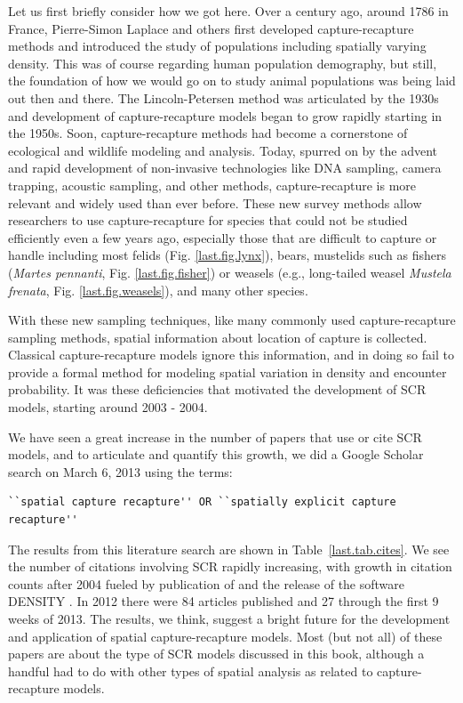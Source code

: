 Let us first briefly consider how we got here. Over a century ago,
around 1786 in France, Pierre-Simon Laplace and others first developed
capture-recapture methods and introduced the study of populations
including spatially varying density. This was of course regarding
human population demography, but still, the foundation of how we would
go on to study animal populations was being laid out then and there.
The Lincoln-Petersen method was articulated by the 1930s and
development of capture-recapture models began to grow rapidly starting
in the 1950s.  Soon, capture-recapture methods had become a
cornerstone of ecological and wildlife modeling and analysis. Today,
spurred on by the advent and rapid development of non-invasive
technologies like DNA sampling, camera trapping, acoustic sampling,
and other methods, capture-recapture is more relevant and widely used
than ever before. These new survey methods allow researchers to use
capture-recapture for species that could not be studied efficiently
even a few years ago, especially those that are difficult to capture
or handle including most felids (Fig. \ref{last.fig.lynx}), bears,
mustelids such as fishers ({\it Martes pennanti},
Fig. \ref{last.fig.fisher}) or weasels (e.g., long-tailed weasel {\it
  Mustela frenata}, Fig. \ref{last.fig.weasels}), and many other
species.

With these new sampling techniques, like many commonly used
capture-recapture sampling methods, spatial information about location
of capture is collected.  Classical capture-recapture models ignore
this information, and in doing so fail to provide a formal method for
modeling spatial variation in density and encounter probability.  It
was these deficiencies that motivated the development of SCR models,
starting around 2003 - 2004.

We have seen a great increase in the number of papers that use or cite
SCR models, and to articulate and quantify this growth, we did a
Google Scholar search on March 6, 2013 using the terms:
\begin{small}
\begin{verbatim}
``spatial capture recapture'' OR ``spatially explicit capture recapture''
\end{verbatim}
\end{small}
The results from this literature search are shown in
Table~\ref{last.tab.cites}.  We see the number of citations involving
SCR rapidly increasing, with growth in citation counts after 2004
fueled by publication of \citet{efford:2004} and the release of the
software DENSITY \citep{efford_etal:2004}. In 2012 there were 84
articles published and 27 through the first 9 weeks of 2013.  The
results, we think, suggest a bright future for the development and
application of spatial capture-recapture models. Most (but not all) of
these papers are about the type of SCR models discussed in this book,
although a handful had to do with other types of spatial analysis as
related to capture-recapture models.

